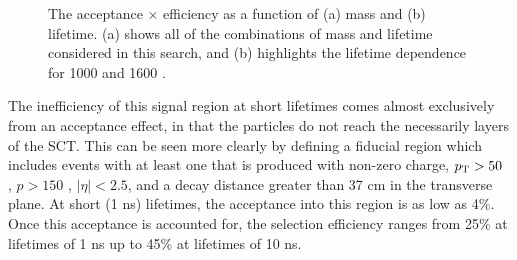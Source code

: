 \begin{figure}
\centering
{}
\label{fig:efficiency}
\caption{The acceptance $\times$ efficiency as a function of \rhadron (a) mass and (b) lifetime. (a) shows all of the combinations of mass and lifetime considered in this search, and (b) highlights the lifetime dependence for 1000 \GeV and 1600 \GeV \rhadrons.}
\end{figure}

The inefficiency of this signal region at short lifetimes comes almost exclusively from an acceptance effect, in that the particles do not reach the necessarily layers of the SCT.
This can be seen more clearly by defining a fiducial region which includes events with at least one \rhadron that is produced with non-zero charge, $p_{\mathrm{T}} > 50$ \GeV, $p > 150$ \GeV, $|\eta| < 2.5$, and a decay distance greater than 37 cm in the transverse plane.
At short (1 ns) lifetimes, the acceptance into this region is as low as 4\%. 
Once this acceptance is accounted for, the selection efficiency ranges from 25\% at lifetimes of 1 ns up to 45\% at lifetimes of 10 ns. 


